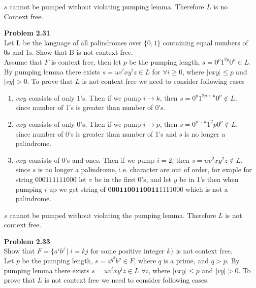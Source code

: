 \documentclass{article}
\newcommand{\problem}[1]{\large{\textbf{Problem #1} \\}}
\begin{document}
$s$ cannot be pumped without violating pumping lemma. Therefore $L$ is no Context free.

\vspace{0.4cm}
\problem{2.31}
Let L be the language of all palindromes over $\{0,1\}$ containing equal numbers of 0s and 1s. 
Show that B is not context free. \\

Assume that $F$ is context free, then let $p$ be the pumping length, $s = 0^p 1^{2p} 0^p\in L$. By pumping lemma 
there exists $s = uv^ixy^iz \in L$ for $\forall i \geq 0$, where $|vxy| \leq p$ and $|vy| > 0$. To prove
that $L$ is not context free we need to consider following cases \\

\begin{enumerate}[\underline{Case} 1., leftmargin = 1.5cm]
\itemsep0em
\item $vxy$ consists of only 1's. Then if we pump $i \rightarrow k$, then $s = 0^p 1^{2p+k} 0^p \notin L$, since
number of 1's is greater than number of 0's.
\item $vxy$ consists of only 0's. Then if we pump $i \rightarrow p$, then $s = 0^{p+k} 1^2p 0^p \notin L$, since
number of 0's is greater than number of 1's and $s$ is no longer a palindrome.
\item $vxy$ consists of 0's and ones. Then if we pump $i = 2$, then $s = u v^2 x y^2 z \notin L$, since
$s$ is no longer a palindrome, i.e. character are out of order, for exaple for string $000111111000$ let $v$
be in the first 0's, and let $y$ be in 1's then when pumping $i$ up we get string of $0 \mathbf{0011 0011 0011 }1111000$
which is not a palindrome.
\end{enumerate}

$s$ cannot be pumped without violating the pumping lemma. Therefore $L$ is not context free.

\pagebreak

\problem{2.33}
Show that $F = \{a^i b^j\: |\: i = kj\text{ for some positive integer } k\}$ is not context free. \\

Let $p$ be the pumping length, $s = a^{q^2} b^q \in F$, where $q$ is a prime, and $q > p$. By pumping lemma 
there exists $s = uv^ixy^iz \in L$ $\forall i$, where $|vxy| \leq p$ and $|vy| > 0$. To prove
that $L$ is not context free we need to consider following cases:
\end{document}
